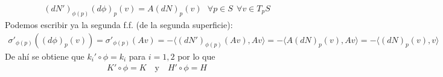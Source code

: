 \begin{ejercicio}
    \begin{gather*}
        (dN')_{\phi(p)}(d\phi)_p(v) = A(dN)_p(v) \ \ \ \forall p \in S\ \ \forall v \in T_pS
    \end{gather*}
    Podemos escribir ya la segunda f.f. (de la segunda superficie):
    \begin{gather*}
        \sigma'_{\phi(p)}((d\phi)_p(v)) = \sigma'_{\phi(p)}(Av) = - \langle (dN')_{\phi(p)}(Av), Av \rangle = -\langle A(dN)_p(v), Av \rangle = - \langle (dN)_p(v), v \rangle
    \end{gather*}
    De ahí se obtiene que $k_i' \circ \phi = k_i$ para $i=1,2$ por lo que 
    \begin{gather*}
        K'\circ \phi = K \ \ \ \text{ y } \ \ \ H'\circ \phi = H
    \end{gather*}
\end{ejercicio}

